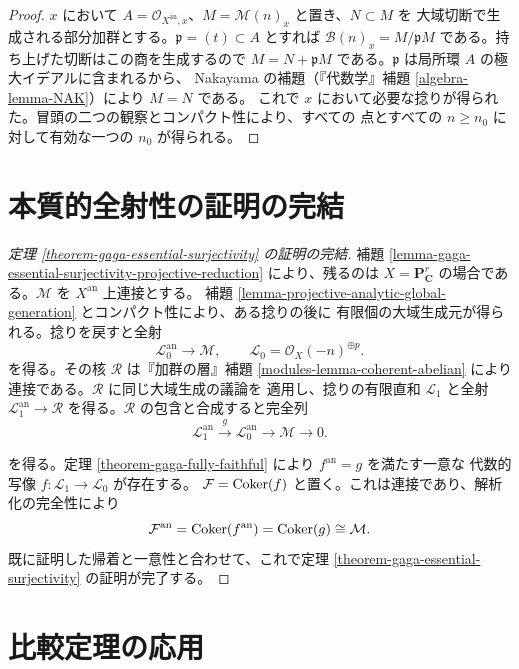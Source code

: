 \begin{proof}
$x$ において $A=\mathcal O_{X^{\mathrm{an}},x}$、$M=\mathcal M(n)_x$ と置き、$N\subset M$ を
大域切断で生成される部分加群とする。$\mathfrak p=(t)\subset A$ とすれば
$\mathcal B(n)_x=M/\mathfrak pM$ である。持ち上げた切断はこの商を生成するので
$M=N+\mathfrak pM$ である。$\mathfrak p$ は局所環 $A$ の極大イデアルに含まれるから、
Nakayama の補題（『代数学』補題 \ref{algebra-lemma-NAK}）により $M=N$ である。
これで $x$ において必要な捻りが得られた。冒頭の二つの観察とコンパクト性により、すべての
点とすべての $n\geq n_0$ に対して有効な一つの $n_0$ が得られる。
\end{proof}

\section{本質的全射性の証明の完結}
\label{section-completion-gaga-essential-surjectivity}

\begin{proof}[定理
\ref{theorem-gaga-essential-surjectivity} の証明の完結]
補題 \ref{lemma-gaga-essential-surjectivity-projective-reduction} により、残るのは
$X=\mathbf P^r_{\mathbf C}$ の場合である。$\mathcal M$ を $X^{\mathrm{an}}$ 上連接とする。
補題 \ref{lemma-projective-analytic-global-generation} とコンパクト性により、ある捻りの後に
有限個の大域生成元が得られる。捻りを戻すと全射
$$
\mathcal L_0^{\mathrm{an}}\longrightarrow\mathcal M,
\qquad
\mathcal L_0=\mathcal O_X(-n)^{\oplus p}.
$$
を得る。その核 $\mathcal R$ は『加群の層』補題
\ref{modules-lemma-coherent-abelian} により連接である。$\mathcal R$ に同じ大域生成の議論を
適用し、捻りの有限直和 $\mathcal L_1$ と全射
$\mathcal L_1^{\mathrm{an}}\to\mathcal R$ を得る。$\mathcal R$ の包含と合成すると完全列
$$
\mathcal L_1^{\mathrm{an}}\xrightarrow{g}
\mathcal L_0^{\mathrm{an}}\longrightarrow\mathcal M\longrightarrow0.
$$

を得る。定理 \ref{theorem-gaga-fully-faithful} により $f^{\mathrm{an}}=g$ を満たす一意な
代数的写像 $f:\mathcal L_1\to\mathcal L_0$ が存在する。
$\mathcal F=\mathop{\rm Coker}(f)$ と置く。これは連接であり、解析化の完全性により
$$
\mathcal F^{\mathrm{an}}
=\mathop{\rm Coker}(f^{\mathrm{an}})
=\mathop{\rm Coker}(g)
\cong\mathcal M.
$$
既に証明した帰着と一意性と合わせて、これで定理
\ref{theorem-gaga-essential-surjectivity} の証明が完了する。
\end{proof}

\section{比較定理の応用}
\label{section-gaga-applications}

